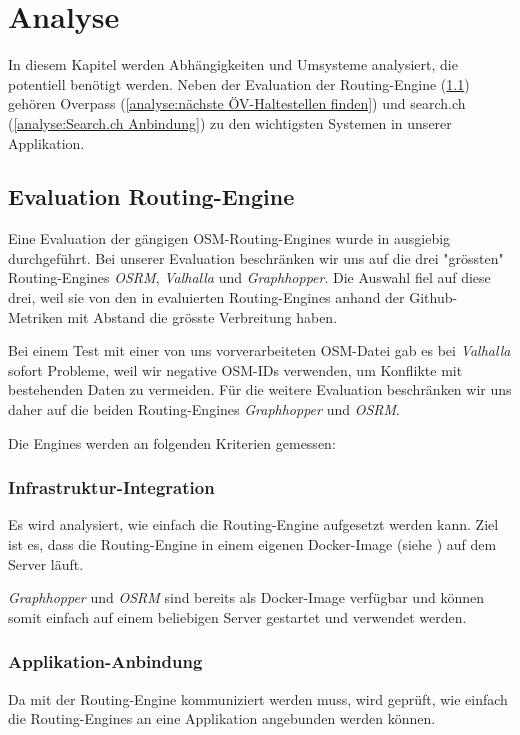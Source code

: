 \section{Analyse}
\label{sec:Analyse}

In diesem Kapitel werden Abhängigkeiten und Umsysteme analysiert, die potentiell benötigt werden. Neben der Evaluation der Routing-Engine (\ref{analyse:Evaluation Routing-Engine}) gehören Overpass (\ref{analyse:nächste ÖV-Haltestellen finden}) und search.ch (\ref{analyse:Search.ch Anbindung}) zu den wichtigsten Systemen in unserer Applikation.

\subsection{Evaluation Routing-Engine}
\label{analyse:Evaluation Routing-Engine}
Eine Evaluation der gängigen \ac{OSM}-Routing-Engines wurde in \cite{eval_routing_engine} ausgiebig durchgeführt. Bei unserer Evaluation beschränken wir uns auf die drei "grössten" Routing-Engines \emph{OSRM}\cite{osrm}, \emph{Valhalla}\cite{valhalla} und \emph{Graphhopper}\cite{graphhopper}. Die Auswahl fiel auf diese drei, weil sie von den in \cite{eval_routing_engine} evaluierten Routing-Engines anhand der Github-Metriken mit Abstand die grösste Verbreitung haben.

Bei einem Test mit einer von uns vorverarbeiteten \ac{OSM}-Datei gab es bei \emph{Valhalla} sofort Probleme, weil wir negative \ac{OSM}-IDs verwenden, um Konflikte mit bestehenden Daten zu vermeiden. Für die weitere Evaluation beschränken wir uns daher auf die beiden Routing-Engines \emph{Graphhopper} und \emph{OSRM}.

Die Engines werden an folgenden Kriterien gemessen:

\subsubsection{Infrastruktur-Integration}
\label{analyse:Infrastruktur-Integration}
Es wird analysiert, wie einfach die Routing-Engine aufgesetzt werden kann. Ziel ist es, dass die Routing-Engine in einem eigenen Docker-Image (siehe ) auf dem Server läuft.

\emph{Graphhopper} und \emph{OSRM} sind bereits als Docker-Image verfügbar und können somit einfach auf einem beliebigen Server gestartet und verwendet werden.


\subsubsection{Applikation-Anbindung}
\label{analyse:Applikation-Anbindung}
Da mit der Routing-Engine kommuniziert werden muss, wird geprüft, wie einfach die Routing-Engines an eine Applikation angebunden werden können.

